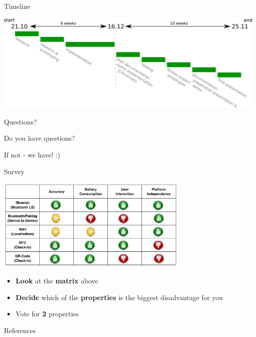 \documentclass[9pt]{beamer}
\begin{document}
\begin{frame}{Timeline}

	\begin{center}
		
		\includegraphics[width=\textwidth]{Timeline}%

	\end{center}

\end{frame}

\begin{frame}{Questions?}

	\begin{center}

		{\Huge Do you have questions?}
		
		\vspace{1cm}
		
		{\Large If not - we have! :)}
		
	\end{center}

\end{frame}

\begin{frame}{Survey}

	\begin{center}

		\includegraphics[width=0.7\textwidth]{matrix}
		
	\end{center}

	\begin{itemize}
		\setlength{\itemsep}{1ex}
		\item \textbf{Look} at the \textbf{matrix} above
		\item \textbf{Decide} which of the \textbf{properties} is the biggest disadvantage for you
		\item Vote for \textbf{2} properties
	\end{itemize}

\end{frame}


\begin{frame}[allowframebreaks]{References}

	

\end{frame}
\end{document}
